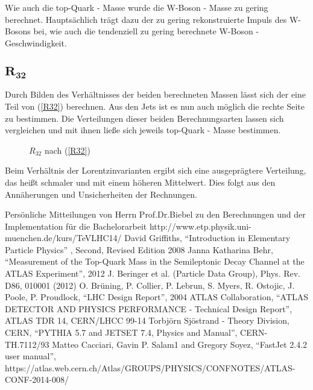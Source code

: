 \documentclass[
a4paper,                                %
twoside,                                %
BCOR1.4cm,                      %
ngerman,                                %
10pt,                           %
headings=normal,                %
headsepline,                    %
clearplainpage, %
final,                                  %
div=14,
parskip=full
]{scrbook}
\begin{document}
Wie auch die top-Quark - Masse wurde die W-Boson - Masse zu gering berechnet. Haupts\"achlich tr\"agt dazu der zu gering rekonstruierte Impuls des W-Bosons bei, wie auch die tendenziell zu gering berechnete W-Boson - Geschwindigkeit.

\newpage

\subsection*{$ \boldsymbol{R_{32}} $}

Durch Bilden des Verh\"altnisses der beiden berechneten Massen l\"asst sich der eine Teil von (\ref{R32}) berechnen. Aus den Jets ist es nun auch m\"oglich die rechte Seite zu bestimmen. Die Verteilungen dieser beiden Berechnungsarten lassen sich vergleichen und mit ihnen lie\ss e sich jeweils top-Quark - Masse bestimmen.

\begin{figure}[h]
    \caption{$ R_{32} $ nach (\ref{R32})}
\end{figure}

Beim Verh\"altnis der Lorentzinvarianten ergibt sich eine ausgepr\"agtere Verteilung, das hei\ss t schmaler und mit einem h\"oheren Mittelwert. Dies folgt aus den Ann\"aherungen und Unsicherheiten der Rechnungen.

\begin{thebibliography}{xx}
	 Pers\"onliche Mitteilungen von Herrn Prof.Dr.Biebel zu den Berechnungen und der Implementation f\"ur die Bachelorarbeit	
	 http://www.etp.physik.uni-muenchen.de/kurs/TeVLHC14/
	 David Griffiths, "`Introduction in Elementary Particle Physics"' , Second, Revised Edition 2008
   	 Janna Katharina Behr, "`Measurement of the Top-Quark Mass in the Semileptonic Decay Channel at the ATLAS Experiment"', 2012
   	 J. Beringer et al. (Particle Data Group), Phys. Rev. D86, 010001 (2012)
   	 O. Br\"uning, P. Collier, P. Lebrun, S. Myers, R. Ostojic, J. Poole, P. Proudlock, "`LHC Design Report"', 2004
   	 ATLAS Collaboration, "`ATLAS DETECTOR AND PHYSICS PERFORMANCE - Technical Design Report"', ATLAS TDR 14, CERN/LHCC 99-14
   	 Torbj\"orn Sj\"ostrand - Theory Division, CERN, "`PYTHIA 5.7 and JETSET 7.4, Physics and Manual"', CERN-TH.7112/93
   	 Matteo Cacciari, Gavin P. Salam1 and Gregory Soyez, "`FastJet 2.4.2 user manual"', 
   	 https://atlas.web.cern.ch/Atlas/GROUPS/PHYSICS/CONFNOTES/ATLAS-CONF-2014-008/
\end{thebibliography}
\end{document}
